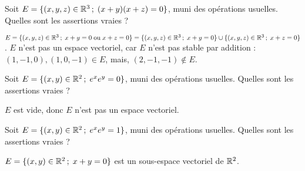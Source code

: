 \begin{question}
Soit $E=\{(x,y,z) \in \mathbb{R}^3 \,  ; \; (x+y)(x+z)=0\}$, muni des opérations usuelles. Quelles sont les assertions vraies ?
\begin{answers}  
\end{answers}
\begin{explanations} 
$E= \{(x,y,z) \in \mathbb{R}^3 \,  ;\;  x+y=0 \; \mbox{ou} \;  x+z=0  \} =\{(x,y,z) \in \mathbb{R}^3 \,  ;\;  x+y=0\} \cup   
\{(x,y,z) \in \mathbb{R}^3 \,  ; \;  x+z=0\}$.
$E$ n'est pas un espace vectoriel, car $E$ n'est pas stable par addition : $(1,-1,0), (1,0,-1) \in E$, mais,  
$(2,-1,-1) \notin E$.
\end{explanations}
\end{question}

\begin{question}
Soit $E=\{(x,y) \in \mathbb{R}^2 \, ; \;  e^xe^y=0\}$, muni des opérations usuelles. Quelles sont les assertions vraies ?
\begin{answers}  
\end{answers}
\begin{explanations} $E$ est vide, donc $E$ n'est pas un espace vectoriel.
\end{explanations}
\end{question}

\begin{question}
Soit $E=\{(x,y) \in \mathbb{R}^2 \,  ; \;  e^xe^y=1\}$, muni des opérations usuelles. Quelles sont les assertions vraies ?
\begin{answers}  
\end{answers}
\begin{explanations} $E=\{(x,y) \in \mathbb{R}^2 \, ; \;  x+y=0\}$ est un sous-espace vectoriel de $\mathbb{R}^2$.
\end{explanations}
\end{question}

